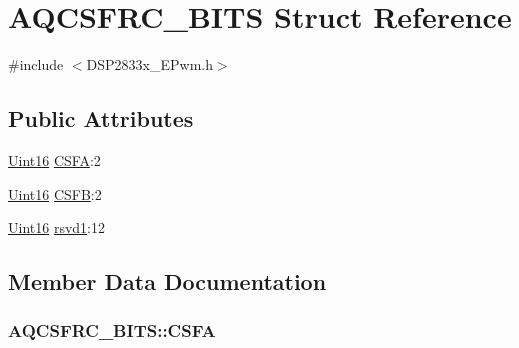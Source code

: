 \hypertarget{struct_a_q_c_s_f_r_c___b_i_t_s}{}\section{A\+Q\+C\+S\+F\+R\+C\+\_\+\+B\+I\+T\+S Struct Reference}
\label{struct_a_q_c_s_f_r_c___b_i_t_s}


{\ttfamily \#include $<$D\+S\+P2833x\+\_\+\+E\+Pwm.\+h$>$}

\subsection*{Public Attributes}
\begin{DoxyCompactItemize}
\item 
\hyperlink{_d_s_p2833x___device_8h_a59a9f6be4562c327cbfb4f7e8e18f08b}{Uint16} \hyperlink{struct_a_q_c_s_f_r_c___b_i_t_s_a8b6ffc79b09d27c6e83c6b832151bcc4}{C\+S\+F\+A}\+:2
\item 
\hyperlink{_d_s_p2833x___device_8h_a59a9f6be4562c327cbfb4f7e8e18f08b}{Uint16} \hyperlink{struct_a_q_c_s_f_r_c___b_i_t_s_aa24b9e006ae4e4ce2a7167e470cb9e15}{C\+S\+F\+B}\+:2
\item 
\hyperlink{_d_s_p2833x___device_8h_a59a9f6be4562c327cbfb4f7e8e18f08b}{Uint16} \hyperlink{struct_a_q_c_s_f_r_c___b_i_t_s_aa9fe8f62c165ed323c1b94b6836a6689}{rsvd1}\+:12
\end{DoxyCompactItemize}


\subsection{Member Data Documentation}
\hypertarget{struct_a_q_c_s_f_r_c___b_i_t_s_a8b6ffc79b09d27c6e83c6b832151bcc4}{}
\subsubsection[{C\+S\+F\+A}]{ A\+Q\+C\+S\+F\+R\+C\+\_\+\+B\+I\+T\+S\+::\+C\+S\+F\+A}\label{struct_a_q_c_s_f_r_c___b_i_t_s_a8b6ffc79b09d27c6e83c6b832151bcc4}
\hypertarget{struct_a_q_c_s_f_r_c___b_i_t_s_aa24b9e006ae4e4ce2a7167e470cb9e15}{}
